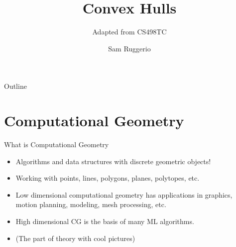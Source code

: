 \documentclass[aspectratio=169]{beamer}
\title{Convex Hulls}
\subtitle{Adapted from CS498TC \cite{site:jeff}}
\author{Sam Ruggerio}
\date{}
\begin{document}

\begin{frame}
\titlepage
\end{frame}

\begin{frame}{Outline}
  \tableofcontents
\end{frame}


\section{Computational Geometry}
\frame{\sectionpage}

\begin{frame}{What is Computational Geometry}
    \begin{itemize}
        \item Algorithms and data structures with discrete geometric objects! \pause 
        \item Working with points, lines, polygons, planes, polytopes, etc. \pause
        \item Low dimensional computational geometry has applications in graphics, motion planning, modeling, mesh processing, etc. \pause 
        \item High dimensional CG is the basis of many ML algorithms. \pause 
        \item (The part of theory with cool pictures)
    \end{itemize}
\end{frame}
\end{document}
